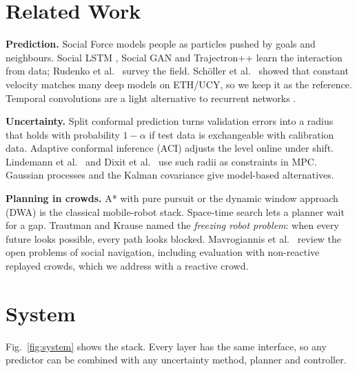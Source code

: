\section{Related Work}
\textbf{Prediction.} Social Force \cite{helbing1995} models people as
particles pushed by goals and neighbours. Social LSTM \cite{alahi2016},
Social GAN \cite{gupta2018} and Trajectron++ \cite{salzmann2020} learn the
interaction from data; Rudenko et al.\ \cite{rudenko2020} survey the field.
Sch\"oller et al.\ \cite{scholler2020} showed that constant velocity
matches many deep models on ETH/UCY, so we keep it as the reference.
Temporal convolutions \cite{bai2018} are a light alternative to recurrent
networks \cite{hochreiter1997}.

\textbf{Uncertainty.} Split conformal prediction \cite{vovk2005} turns
validation errors into a radius that holds with probability $1-\alpha$ if
test data is exchangeable with calibration data. Adaptive conformal
inference (ACI) \cite{gibbs2021} adjusts the level online under shift.
Lindemann et al.\ \cite{lindemann2023} and Dixit et al.\ \cite{dixit2023}
use such radii as constraints in MPC. Gaussian processes
\cite{rasmussen2006} and the Kalman covariance \cite{kalman1960} give
model-based alternatives.

\textbf{Planning in crowds.} A* \cite{hart1968} with pure pursuit
\cite{coulter1992} or the dynamic window approach (DWA) \cite{fox1997} is
the classical mobile-robot stack. Space-time search \cite{silver2005} lets
a planner wait for a gap. Trautman and Krause \cite{trautman2010} named
the \emph{freezing robot problem}: when every future looks possible, every
path looks blocked. Mavrogiannis et al.\ \cite{mavrogiannis2023} review
the open problems of social navigation, including evaluation with
non-reactive replayed crowds, which we address with a reactive crowd.

\section{System}
Fig.~\ref{fig:system} shows the stack. Every layer has the same
interface, so any predictor can be combined with any uncertainty method,
planner and controller.

